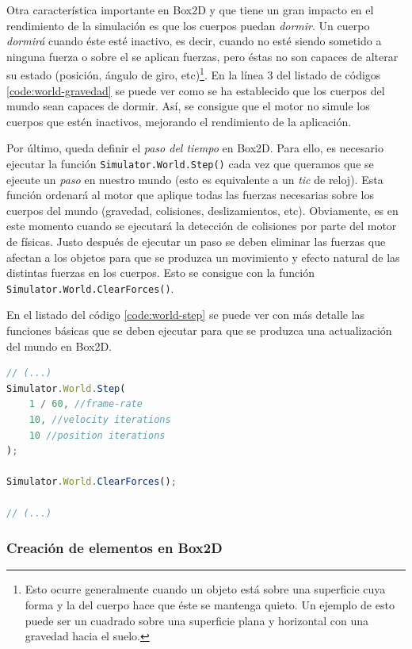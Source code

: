 Otra característica importante en Box2D y que tiene un gran impacto en el rendimiento de la simulación es que los cuerpos puedan \emph{dormir}. Un cuerpo \emph{dormirá} cuando éste esté inactivo, es decir, cuando no esté siendo sometido a ninguna fuerza o sobre el se aplican fuerzas, pero éstas no son capaces de alterar su estado (posición, ángulo de giro, etc)\footnote{Esto ocurre generalmente cuando un objeto está sobre una superficie cuya forma y la del cuerpo hace que éste se mantenga quieto. Un ejemplo de esto puede ser un cuadrado sobre una superficie plana y horizontal con una gravedad hacia el suelo.}. En la línea 3 del listado de códigos \ref{code:world-gravedad} se puede ver como se ha establecido que los cuerpos del mundo sean capaces de dormir. Así, se consigue que el motor no simule los cuerpos que estén inactivos, mejorando el rendimiento de la aplicación.

Por último, queda definir el \emph{paso del tiempo} en Box2D. Para ello, es necesario ejecutar la función \texttt{Simulator.World.Step()} cada vez que queramos que se ejecute un \emph{paso} en nuestro mundo (esto es equivalente a un \emph{tic} de reloj). Esta función ordenará al motor que aplique todas las fuerzas necesarias sobre los cuerpos del mundo (gravedad, colisiones, deslizamientos, etc). Obviamente, es en este momento cuando se ejecutará la detección de colisiones por parte del motor de físicas. Justo después de ejecutar un paso se deben eliminar las fuerzas que afectan a los objetos para que se produzca un movimiento y efecto natural de las distintas fuerzas en los cuerpos. Esto se consigue con la función \texttt{Simulator.World.ClearForces()}.

En el listado del código  \ref{code:world-step} se puede ver con más detalle las funciones básicas que se deben ejecutar para que se produzca una actualización del mundo en Box2D.

\begin{lstlisting}[language={Javascript},label={code:world-step}, caption={Actualización del mundo en \texttt{Box2D}.}]
// (...)
Simulator.World.Step(
	1 / 60, //frame-rate
	10, //velocity iterations
	10 //position iterations
);

Simulator.World.ClearForces();

// (...)
\end{lstlisting}


\subsubsection{Creación de elementos en Box2D}



